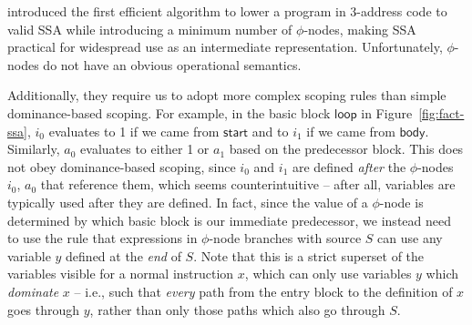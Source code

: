 \documentclass[acmsmall,screen,review]{acmart}
\newcommand{\ms}[1]{\ensuremath{\mathsf{#1}}}
\begin{document}
\citet{cytron-ssa-intro-91} introduced the first efficient algorithm to lower a program in 3-address
code to valid SSA while introducing a minimum number of $\phi$-nodes, making SSA practical for
widespread use as an intermediate representation. Unfortunately, $\phi$-nodes do not have an obvious
operational semantics.

Additionally, they require us to adopt more complex scoping rules than simple
dominance-based scoping. For example, in the basic block \ms{loop} in Figure~\ref{fig:fact-ssa},
$i_0$ evaluates to 1 if we came from \ms{start} and to $i_1$ if we came from \ms{body}. Similarly,
$a_0$ evaluates to either 1 or $a_1$ based on the predecessor block. This does not obey
dominance-based scoping, since $i_0$ and $i_1$ are defined \emph{after} the $\phi$-nodes $i_0$,
$a_0$ that reference them, which seems counterintuitive -- after all, variables are typically used
after they are defined. In fact, since the value of a $\phi$-node is determined by which basic block
is our immediate predecessor, we instead need to use the rule that expressions in $\phi$-node
branches with source $S$ can use any variable $y$ defined at the \emph{end} of $S$. Note that this
is a strict superset of the variables visible for a normal instruction $x$, which can only use
variables $y$ which \emph{dominate} $x$ -- i.e., such that \emph{every} path from the entry block to
the definition of $x$ goes through $y$, rather than only those paths which also go through $S$.
\end{document}
